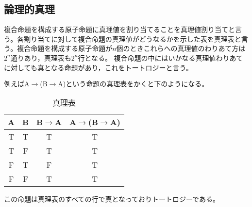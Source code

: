 \documentclass[10pt,b5paper,papersize,dvipdfmx]{jsbook}
\begin{document}
\subsection{論理的真理}
複合命題を構成する原子命題に真理値を割り当てることを真理値割り当てと言う。各割り当てに対して複合命題の真理値がどうなるかを示した表を真理表と言う。複合命題を構成する原子命題が$n$個のときこれらへの真理値のわりあて方は$2^n$通りあり，真理表も$2^n$行となる。
複合命題の中にはいかなる真理値わりあてに対しても真となる命題があり，これをトートロジーと言う。\par
例えばA$\to$(B$\to$A)という命題の真理表をかくと下のようになる。
\begin{table}[H]
\begin{center}
\caption{真理表}
\begin{tabular}{|c|c||c|c|}\hline
A&B&B$\to$A&A$\to$(B$\to$A) \\ \hline \hline
T&T&T&T \\ \hline
T&F&T&T \\ \hline
F&T&F&T \\ \hline
F&F&T&T \\ \hline
\end{tabular}
\end{center}
\end{table}
この命題は真理表のすべての行で真となっておりトートロジーである。
\end{document}
